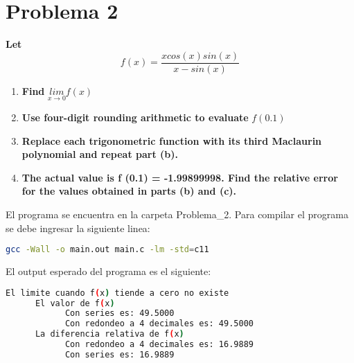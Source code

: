 \section*{Problema 2}
\textbf{Let}
\begin{equation}
      f(x) = \frac{xcos(x)sin(x)}{x-sin(x)}
      \label{eq:problem2fx}
\end{equation}
\begin{enumerate}
      \item \textbf{Find} $\underset{x\rightarrow 0}{lim} f(x)$

            
      \item \textbf{Use four-digit rounding arithmetic to evaluate} $f(0.1)$

            
      \item \textbf{Replace each trigonometric function with its third Maclaurin polynomial and repeat part (b).}

            
      \item \textbf{The actual value is f (0.1) = -1.99899998. Find the relative error for the values obtained in parts (b) and (c).}

            
\end{enumerate}

El programa se encuentra en la carpeta \textcolor{citecolor}{Problema\_2}. Para compilar el programa se debe ingresar la siguiente linea:
\begin{lstlisting}[language=bash]
      gcc -Wall -o main.out main.c -lm -std=c11    
\end{lstlisting}

El output esperado del programa es el siguiente:

\begin{lstlisting}[language=bash]
      El limite cuando f(x) tiende a cero no existe
      El valor de f(x)
            Con series es: 49.5000
            Con redondeo a 4 decimales es: 49.5000
      La diferencia relativa de f(x)
            Con redondeo a 4 decimales es: 16.9889
            Con series es: 16.9889
\end{lstlisting}
